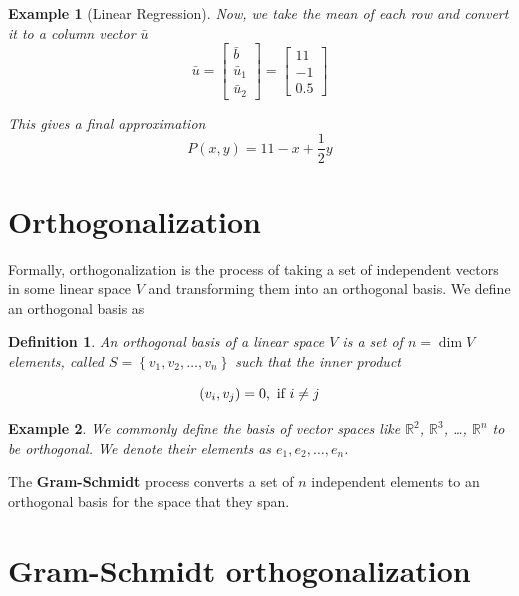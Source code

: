 \documentclass{book}
\newtheorem{example}{Example}[section]
\newtheorem{definition}{Definition}[section]
\begin{document}
\begin{example}[Linear Regression]
    Now, we take the mean of each row and convert it to a column vector $\bar{u}$
    \[
        \bar{u} = \left[
            \begin{matrix}
                \bar{b} \\\bar{u}_1\\\bar{u}_2
            \end{matrix}
            \right] = \left[
            \begin{matrix}
                11 \\ -1 \\ 0.5
            \end{matrix}
            \right]
    \]

    This gives a final approximation
    \[
        P(x, y) = 11 - x + \dfrac{1}{2}y
    \]
\end{example}

\section{Orthogonalization}

Formally, orthogonalization is the process of taking a set of independent
vectors in some linear space $V$ and transforming them into an orthogonal
basis. We define an orthogonal basis as

\begin{definition}
    An orthogonal basis of a linear space $V$ is a set of $n=\dim V$ elements, called
    $S=\left\{v_1,v_2,\dots,v_n\right\}$ such that the inner product

    \begin{equation}
        \left(v_i, v_j\right) = 0, \textnormal{ if } i\neq j
    \end{equation}
\end{definition}

\begin{example}
    We commonly define the basis of vector spaces like $\mathbb{R}^{2}$, $\mathbb{R}^{3}$, \dots, $\mathbb{R}^{n}$ to be orthogonal.
    We denote their elements as $e_1, e_2,\dots, e_n$.
\end{example}

The \textbf{Gram-Schmidt} process converts a set of $n$ independent elements to
an orthogonal basis for the space that they span.

\section{Gram-Schmidt orthogonalization}
\end{document}
